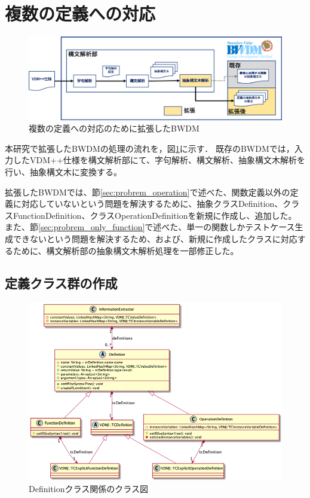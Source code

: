 \documentclass[uplatex, report, a4j, 10pt]{jsbook}
\begin{document}
\section{複数の定義への対応}
\begin{figure}[tp]
  \centering
  \includegraphics[keepaspectratio, width=160mm]{figs/multi_bwdm_structure}
  \caption{複数の定義への対応のために拡張したBWDM}
  \label{fig:multi_bwdm_structure}
\end{figure}

本研究で拡張したBWDMの処理の流れを，図\ref{fig:multi_bwdm_structure}に示す．
既存のBWDMでは，入力したVDM++仕様を構文解析部にて、字句解析、構文解析、抽象構文木解析を行い、抽象構文木に変換する。

拡張したBWDMでは、節\ref{sec:probrem_operation}で述べた、関数定義以外の定義に対応していないという問題を解決するために、抽象クラスDefinition、クラスFunctionDefinition、クラスOperationDefinitionを新規に作成し、追加した。
また、節\ref{sec:probrem_only_function}で述べた、単一の関数しかテストケース生成できないという問題を解決するため、および、新規に作成したクラスに対応するために、構文解析部の抽象構文木解析処理を一部修正した。

\subsection{定義クラス群の作成}\label{sec:create_definition}
\begin{figure}[tp]
  \centering
  \includegraphics[keepaspectratio, width=160mm]{figs/Definition_class_diagram}
  \caption{Definitionクラス関係のクラス図}
  \label{fig:definition_class}
\end{figure}
\end{document}
